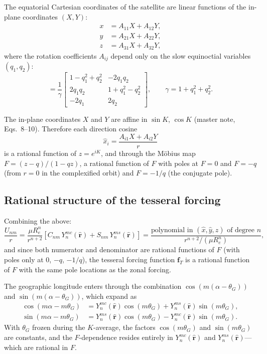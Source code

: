 \documentclass[11pt]{article}
\begin{document}
The equatorial Cartesian coordinates of the satellite are linear functions
of the in-plane coordinates $(X, Y)$:
\begin{align}
x &= A_{11} X + A_{12} Y, \\
y &= A_{21} X + A_{22} Y, \\
z &= A_{31} X + A_{32} Y,
\end{align}
where the rotation coefficients $A_{ij}$ depend only on the slow
equinoctial variables $(q_1, q_2)$:
\begin{equation}
[A_{ij}]
= \frac{1}{\gamma}
\begin{bmatrix}
1 - q_1^2 + q_2^2 & -2q_1 q_2 \\
2q_1 q_2 & 1 + q_1^2 - q_2^2 \\
-2q_1 & 2q_2
\end{bmatrix},
\qquad \gamma = 1 + q_1^2 + q_2^2.
\label{eq:rotation_matrix}
\end{equation}

The in-plane coordinates $X$ and $Y$ are affine in $\sin K$, $\cos K$
(master note, Eqs.~8--10). Therefore each direction cosine
\begin{equation}
\hat x_i = \frac{A_{i1} X + A_{i2} Y}{r}
\end{equation}
is a rational function of $z = e^{iK}$, and through the M\"obius map
$F = (z-q)/(1-qz)$, a rational function of $F$ with poles at $F = 0$ and
$F = -q$ (from $r = 0$ in the complexified orbit) and $F = -1/q$ (the
conjugate pole).

\subsection{Rational structure of the tesseral forcing}

Combining the above:
\begin{equation}
\frac{U_{nm}}{r}
= \frac{\mu R_e^n}{r^{n+2}}
\left[
C_{nm}\,Y_n^{mc}(\hat{\bm r})
+ S_{nm}\,Y_n^{ms}(\hat{\bm r})
\right]
= \frac{\text{polynomial in } (\hat x, \hat y, \hat z) \text{ of degree } n}
       {r^{n+2}/ (\mu R_e^n)},
\end{equation}
and since both numerator and denominator are rational functions of $F$
(with poles only at $0$, $-q$, $-1/q$), the tesseral forcing function
$\bm f_T$ is a rational function of $F$ with the same pole locations as
the zonal forcing.

The geographic longitude enters through the combination
$\cos(m(\alpha - \theta_G))$ and $\sin(m(\alpha - \theta_G))$, which
expand as
\begin{align}
\cos(m\alpha - m\theta_G)
&= Y_n^{mc}(\hat{\bm r})\cos(m\theta_G)
 + Y_n^{ms}(\hat{\bm r})\sin(m\theta_G), \\
\sin(m\alpha - m\theta_G)
&= Y_n^{ms}(\hat{\bm r})\cos(m\theta_G)
 - Y_n^{mc}(\hat{\bm r})\sin(m\theta_G).
\end{align}
With $\theta_G$ frozen during the $K$-average, the factors
$\cos(m\theta_G)$ and $\sin(m\theta_G)$ are constants, and the
$F$-dependence resides entirely in $Y_n^{mc}(\hat{\bm r})$ and
$Y_n^{ms}(\hat{\bm r})$---which are rational in $F$.
\end{document}
